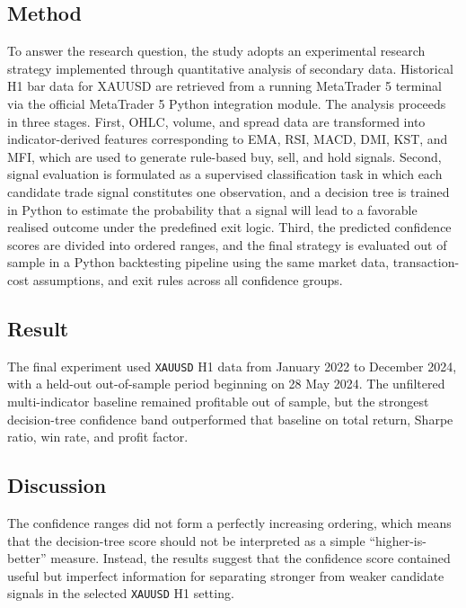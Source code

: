 \subsection*{Method}
To answer the research question, the study adopts an experimental research
strategy implemented through quantitative analysis of secondary data. Historical
H1 bar data for XAUUSD are retrieved from a running MetaTrader 5 terminal via
the official MetaTrader 5 Python integration module. The analysis proceeds in
three stages. First, OHLC, volume, and spread data are transformed into
indicator-derived features corresponding to EMA, RSI, MACD, DMI, KST, and
MFI, which are used to generate rule-based buy, sell, and hold signals. Second,
signal evaluation is formulated as a supervised classification task in which each
candidate trade signal constitutes one observation, and a decision tree is trained
in Python to estimate the probability that a signal will lead to a favorable
realised outcome under the predefined exit logic. Third, the predicted
confidence scores are divided into ordered ranges, and the final strategy is
evaluated out of sample in a Python backtesting pipeline using the same market
data, transaction-cost assumptions, and exit rules across all confidence
groups.
\subsection*{Result}
The final experiment used \texttt{XAUUSD} H1 data from January 2022 to
December 2024, with a held-out out-of-sample period beginning on 28 May 2024.
The unfiltered multi-indicator baseline remained profitable out of sample, but
the strongest decision-tree confidence band outperformed that baseline on total
return, Sharpe ratio, win rate, and profit factor.
\subsection*{Discussion}
The confidence ranges did not form a perfectly increasing ordering, which means
that the decision-tree score should not be interpreted as a simple
``higher-is-better'' measure. Instead, the results suggest that the confidence
score contained useful but imperfect information for separating stronger from
weaker candidate signals in the selected \texttt{XAUUSD} H1 setting.

